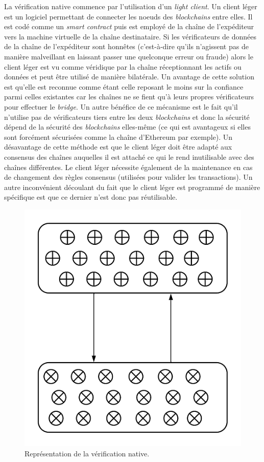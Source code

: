 La vérification native commence par l’utilisation d’un \textit{light client}\cite{NomadDocsNative}. Un client léger est un logiciel permettant de connecter les noeuds des \textit{\gls{blockchain}s} entre elles. Il est codé comme un \textit{\gls{smart contract}} puis est employé de la chaîne de l'expéditeur vers la machine virtuelle de la chaîne destinataire. Si les vérificateurs de données de la chaîne de l'expéditeur sont honnêtes (c’est-à-dire qu’ils n’agissent pas de manière malveillant en laissant passer une quelconque erreur ou fraude) alors le client léger est vu comme véridique par la chaîne réceptionnant les \gls{actif}s ou données et peut être utilisé de manière bilatérale.
 Un avantage de cette solution est qu’elle est reconnue comme étant celle reposant le moins sur la confiance parmi celles existantes car les chaînes ne se fient qu’à leurs propres vérificateurs pour effectuer le \textit{bridge}. Un autre bénéfice de ce mécanisme est le fait qu’il n’utilise pas de vérificateurs tiers entre les deux \textit{\gls{blockchain}s} et donc la sécurité dépend de la sécurité des \textit{\gls{blockchain}s} elles-même (ce qui est avantageux si elles sont forcément sécurisées comme la chaîne d’Ethereum par exemple).
 Un désavantage de cette méthode est que le client léger doit être adapté aux consensus des chaînes auquelles il est attaché ce qui le rend inutilisable avec des chaînes différentes. Le client léger nécessite également de la maintenance en cas de changement des règles consensus (utilisées pour valider les transactions). Un autre inconvénient découlant du fait que le client léger est programmé de manière spécifique est que ce dernier n’est donc pas réutilisable. \\
 \begin{figure}[h!]
    \centering
\includegraphics[scale=0.50]{centralisation/imagesBridges/DiagrammeVerifNative.png}
\caption{Représentation de la vérification native.}
\label{fig:NativeVerif}
\end{figure}

